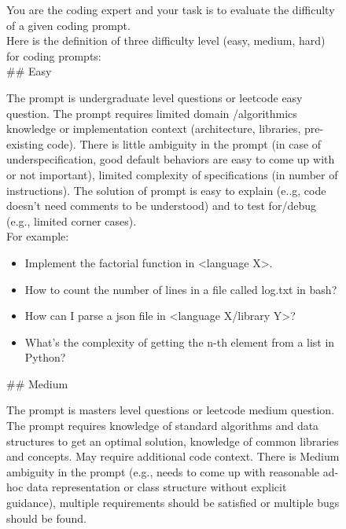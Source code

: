 \begin{figure}
  
\footnotesize
\begin{framed}

You are the coding expert and your task is to evaluate the difficulty of a given coding prompt. \\

Here is the definition of three difficulty level (easy, medium, hard) for coding prompts: \\

\#\# Easy

The prompt is undergraduate level questions or leetcode easy question. The prompt requires limited domain /algorithmics knowledge or implementation context (architecture, libraries, pre-existing code). There is little ambiguity in the prompt (in case of underspecification, good default behaviors are easy to come up with or not important), limited complexity of specifications (in number of instructions). The solution of prompt is easy to explain (e..g, code doesn’t need comments to be understood) and to test for/debug (e.g., limited corner cases). \\

For example:

\begin{itemize}
    \item Implement the factorial function in <language X>.
    \item How to count the number of lines in a file called log.txt in bash?
    \item How can I parse a json file in <language X/library Y>?
    \item What’s the complexity of getting the n-th element from a list in Python?
\end{itemize} 

\vspace{5mm}

\#\# Medium 

The prompt is masters level questions or leetcode medium question. The prompt requires knowledge of standard algorithms and data structures to get an optimal solution, knowledge of common libraries and concepts. May require additional code context. There is Medium ambiguity in the prompt (e.g., needs to come up with reasonable ad-hoc data representation or class structure without explicit guidance), multiple requirements should be satisfied or multiple bugs should be found. \\


\end{framed}
\end{figure}
